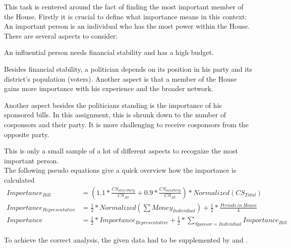 \begin{homeworkProblem}
  This task is centered around the fact of finding the most important member of the House. Firstly it is crucial to define what importance means in this context:\\

  An important person is an individual who has the most power within the House. There are several aspects to consider:
  \begin{description}[labelindent=1cm]
    \item[Money] An influential person needs financial stability and has a high budget.
    \item[Reelections] Besides financial stability, a politician depends on its position in his party and its district's population (voters). Another aspect is that a member of the House gains more importance with his experience and the broader network.
    \item[Bills] Another aspect besides the politicians standing is the importance of his sponsored bills. In this assignment, this is shrunk down to the number of cosponsors and their party. It is more challenging to receive cosponsors from the opposite party.
  \end{description}
  This is only a small sample of a lot of different aspects to recognize the most important person.\\

  The following pseudo equations give a quick overview how the importance is calculated
      \begin{align}
      Importance_{Bill} & = (1.1 * \frac{CS_{other Party}}{CS_{All}} + 0.9 * \frac{CS_{own Party}}{CS_{All}}) * Normalized(CS_{Total}) \\
      Importance_{Representative} & =  \frac{1}{2} * Normalized(\sum Money_{Individual}) + \frac{1}{2} * \frac{Periods~in~House}{4}\\
      Importance & = \frac{1}{2} * Importance_{Representative} + \frac{1}{2} * \sum_{Sponsor = Individual} Importance_{Bill}
    \end{align}

To achieve the correct analysis, the given data had to be supplemented by \cite{ProPublica:bills} and \cite{ProPublica:expenses}.

\end{homeworkProblem}

\newpage
\printbibliography

